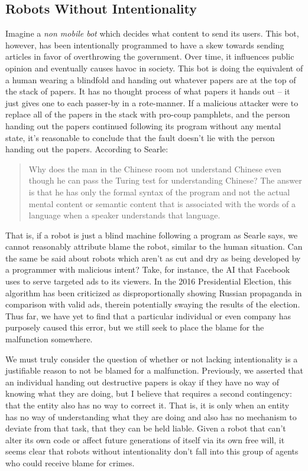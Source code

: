 \documentclass[12]{article}
\begin{document}
	\subsection{Robots Without Intentionality}
		Imagine a \textit{non mobile bot} which decides what content to send its users. This bot, however, has been intentionally programmed to have a skew towards sending articles in favor of overthrowing the government. Over time, it influences public opinion and eventually causes havoc in society. This bot is doing the equivalent of a human wearing a blindfold and handing out whatever papers are at the top of the stack of papers. It has no thought process of what papers it hands out -- it just gives one to each passer-by in a rote-manner. If a malicious attacker were to replace all of the papers in the stack with pro-coup pamphlets, and the person handing out the papers continued following its program without any mental state, it's reasonable to conclude that the fault doesn't lie with the person handing out the papers. According to Searle\cite{chineseroom1, chineseroom2}:
	
		\begin{quote}
			Why does the man in the Chinese room not understand Chinese even though he can pass the Turing test for understanding Chinese? The answer is that he has only the formal syntax of the program and not the actual mental content or semantic content that is associated with the words of a language when a speaker understands that language.
		\end{quote}
	
		That is, if a robot is just a blind machine following a program as Searle says, we cannot reasonably attribute blame the robot, similar to the human situation. Can the same be said about robots which aren't as cut and dry as being developed by a programmer with malicious intent? Take, for instance, the AI that Facebook uses to serve targeted ads to its viewers. In the 2016 Presidential Election, this algorithm has been criticized as disproportionally showing Russian propaganda\cite{facebook_russia} in comparison with valid ads, therein potentially swaying the results of the election. Thus far, we have yet to find that a particular individual or even company has purposely caused this error, but we still seek to place the blame for the malfunction somewhere.
	
		We must truly consider the question of whether or not lacking intentionality is a justifiable reason to not be blamed for a malfunction. Previously, we asserted that an individual handing out destructive papers is okay if they have no way of knowing what they are doing, but I believe that requires a second contingency: that the entity also has no way to correct it. That is, it is only when an entity has no way of understanding what they are doing and also has no mechanism to deviate from that task, that they can be held liable. Given a robot that can't alter its own code or affect future generations of itself via its own free will, it seems clear that robots without intentionality don't fall into this group of agents who could receive blame for crimes.
	
\end{document}
